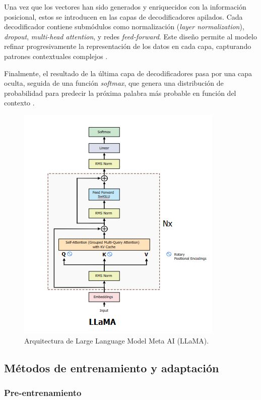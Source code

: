 Una vez que los vectores han sido generados y enriquecidos con la información posicional, estos se introducen en las capas de decodificadores apilados. Cada decodificador contiene submódulos como normalización (\textit{layer normalization}), \textit{dropout}, \textit{multi-head attention}, y redes \textit{feed-forward}. Este diseño permite al modelo refinar progresivamente la representación de los datos en cada capa, capturando patrones contextuales complejos \cite{touvron2023llama}.

Finalmente, el resultado de la última capa de decodificadores pasa por una capa oculta, seguida de una función \textit{softmax}, que genera una distribución de probabilidad para predecir la próxima palabra más probable en función del contexto \cite{touvron2023llama}.

\begin{figure}[H]
  \centering
  \includegraphics[width=0.65\linewidth]{figuras/LLAMA.png}
  \caption{Arquitectura de Large Language Model Meta AI (LLaMA).}
  \label{fig:LLaMA}
\end{figure}




\subsection{Métodos de entrenamiento y adaptación}  

\subsubsection{Pre-entrenamiento}  

